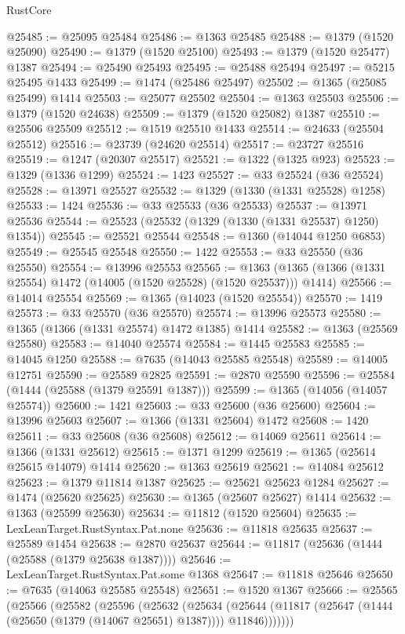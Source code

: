 \begin{lexlean}{RustCore}
\begin{coremodule}
@25485 := @25095 @25484
@25486 := @1363 @25485
@25488 := @1379 (@1520 @25090)
@25490 := @1379 (@1520 @25100)
@25493 := @1379 (@1520 @25477) @1387
@25494 := @25490 @25493
@25495 := @25488 @25494
@25497 := @5215 @25495 @1433
@25499 := @1474 (@25486 @25497)
@25502 := @1365 (@25085 @25499) @1414
@25503 := @25077 @25502
@25504 := @1363 @25503
@25506 := @1379 (@1520 @24638)
@25509 := @1379 (@1520 @25082) @1387
@25510 := @25506 @25509
@25512 := @1519 @25510 @1433
@25514 := @24633 (@25504 @25512)
@25516 := @23739 (@24620 @25514)
@25517 := @23727 @25516
@25519 := @1247 (@20307 @25517)
@25521 := @1322 (@1325 @923)
@25523 := @1329 (@1336 @1299)
@25524 := 1423
@25527 := @33 @25524 (@36 @25524)
@25528 := @13971 @25527
@25532 := @1329 (@1330 (@1331 @25528) @1258)
@25533 := 1424
@25536 := @33 @25533 (@36 @25533)
@25537 := @13971 @25536
@25544 := @25523 (@25532 (@1329 (@1330 (@1331 @25537) @1250) @1354))
@25545 := @25521 @25544
@25548 := @1360 (@14044 @1250 @6853)
@25549 := @25545 @25548
@25550 := 1422
@25553 := @33 @25550 (@36 @25550)
@25554 := @13996 @25553
@25565 := @1363 (@1365 (@1366 (@1331 @25554) @1472 (@14005 (@1520 @25528) (@1520 @25537))) @1414)
@25566 := @14014 @25554
@25569 := @1365 (@14023 (@1520 @25554))
@25570 := 1419
@25573 := @33 @25570 (@36 @25570)
@25574 := @13996 @25573
@25580 := @1365 (@1366 (@1331 @25574) @1472 @1385) @1414
@25582 := @1363 (@25569 @25580)
@25583 := @14040 @25574
@25584 := @1445 @25583
@25585 := @14045 @1250
@25588 := @7635 (@14043 @25585 @25548)
@25589 := @14005 @12751
@25590 := @25589 @2825
@25591 := @2870 @25590
@25596 := @25584 (@1444 (@25588 (@1379 @25591 @1387)))
@25599 := @1365 (@14056 (@14057 @25574))
@25600 := 1421
@25603 := @33 @25600 (@36 @25600)
@25604 := @13996 @25603
@25607 := @1366 (@1331 @25604) @1472
@25608 := 1420
@25611 := @33 @25608 (@36 @25608)
@25612 := @14069 @25611
@25614 := @1366 (@1331 @25612)
@25615 := @1371 @1299
@25619 := @1365 (@25614 @25615 @14079) @1414
@25620 := @1363 @25619
@25621 := @14084 @25612
@25623 := @1379 @11814 @1387
@25625 := @25621 @25623 @1284
@25627 := @1474 (@25620 @25625)
@25630 := @1365 (@25607 @25627) @1414
@25632 := @1363 (@25599 @25630)
@25634 := @11812 (@1520 @25604)
@25635 := LexLeanTarget.RustSyntax.Pat.none
@25636 := @11818 @25635
@25637 := @25589 @1454
@25638 := @2870 @25637
@25644 := @11817 (@25636 (@1444 (@25588 (@1379 @25638 @1387))))
@25646 := LexLeanTarget.RustSyntax.Pat.some @1368
@25647 := @11818 @25646
@25650 := @7635 (@14063 @25585 @25548)
@25651 := @1520 @1367
@25666 := @25565
    (@25566
      (@25582
        (@25596
          (@25632
            (@25634
              (@25644 (@11817 (@25647 (@1444 (@25650 (@1379 (@14067 @25651) @1387)))) @11846)))))))

\end{coremodule}
\end{lexlean}
